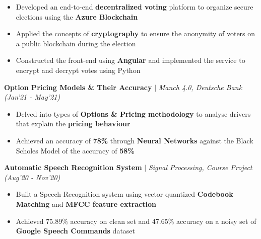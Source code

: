 \documentclass[10pt]{article}
\begin{document}
	\begin{itemize}[label={\textbullet},itemsep = -1 mm, leftmargin=*]
     \item Developed an end-to-end \textbf{decentralized voting} platform to organize secure elections using the \textbf{Azure Blockchain}
     \item Applied the concepts of \textbf{cryptography} to ensure the anonymity of voters on a public blockchain during the election
     \item Constructed the front-end using \textbf{Angular} and implemented the service to encrypt and decrypt votes using Python 
\end{itemize}
\vspace{-6pt}
    \textbf{Option Pricing Models \& Their Accuracy} $|$  \textit{Manch 4.0, Deutsche Bank} \hfill{\sl \small (Jan’21 - May’21)} \\
    \vspace{-0.3cm}
    \hline 
    \vspace{-3pt}    
\begin{itemize}[label={\textbullet},itemsep = -1 mm, leftmargin=*]
    \item Delved into types of \textbf{Options \& Pricing methodology} to analyse drivers that explain the \textbf{pricing behaviour} 
    \item Achieved an accuracy of \textbf{78\%} through \textbf{Neural Networks} against the Black Scholes Model of the accuracy of \textbf{58\%}
\end{itemize}
\vspace{-6pt}
    \textbf{Automatic Speech Recognition System} $|$  \textit{Signal Processing, Course Project} \hfill{\sl \small (Aug'20 - Nov’20)} \\
    \vspace{-0.3cm}
    \hline 
    \vspace{-3pt}    
\begin{itemize}[label={\textbullet},itemsep = -1 mm, leftmargin=*]
    \item Built a Speech Recognition system using vector quantized \textbf{Codebook Matching} and \textbf{MFCC feature extraction}
    \item Achieved 75.89\% accuracy on clean set and 47.65\% accuracy on a noisy set of \textbf{Google Speech Commands} dataset
\end{itemize}
\end{document}

